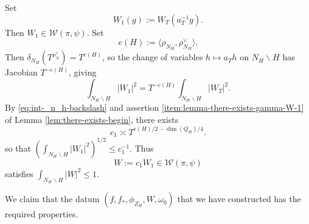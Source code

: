 \documentclass[reqno]{amsart}
\theoremstyle{plain} \newtheorem{theorem} {Theorem}
\theoremstyle{definition} \newtheorem{definition} [theorem] {Definition}
\theoremstyle{itplain} %
\numberwithin{equation}{section}
\numberwithin{theorem}{section}
\renewcommand{\leq}{\leqslant}
\begin{document}
Set
\begin{equation*}
W_1(g) := W_T(a_T^{-1} g).
\end{equation*}
Then $W_1 \in \mathcal{W}(\pi,\psi)$.  Set
\begin{equation*}
  e(H) := \langle \rho_{N_H}, \rho_{N_H}^\vee  \rangle.
\end{equation*}
Then $\delta_{N_H}(T^{\rho_N^\vee}) = T^{e(H)}$, so the change of variables $h \mapsto a_T h$ on $N_H \backslash H$ has Jacobian $T^{-e(H)}$, giving
\begin{equation}\label{eq:int-_n_h-backslash}
  \int _{N_H \backslash H} |W_1|^2
  =
  T^{-e(H)}
  \int _{N_H \backslash H} |W_T|^2.
\end{equation}
By \eqref{eq:int-_n_h-backslash} and assertion \eqref{item:lemma-there-exists-gamma-W-1} of Lemma \ref{lem:there-exists-begin}, there exists
\begin{equation*}
  c_1 \asymp  T^{e(H)/2 - \dim(Q_H)/4}.
\end{equation*}
so that $(\int_{N_H \backslash H} |W_1|^2)^{1/2} \leq c_1^{-1}$.  Thus
\begin{equation*}
W := c_1 W_1 \in \mathcal{W}(\pi,\psi)
\end{equation*}
satisfies $\int_{N_H \backslash H} |W|^2 \leq 1$.

We claim that the datum $(f, f_{\ast}, \phi_{Z_H}, W, \omega_0)$ that we have constructed has the required properties.
\end{document}

